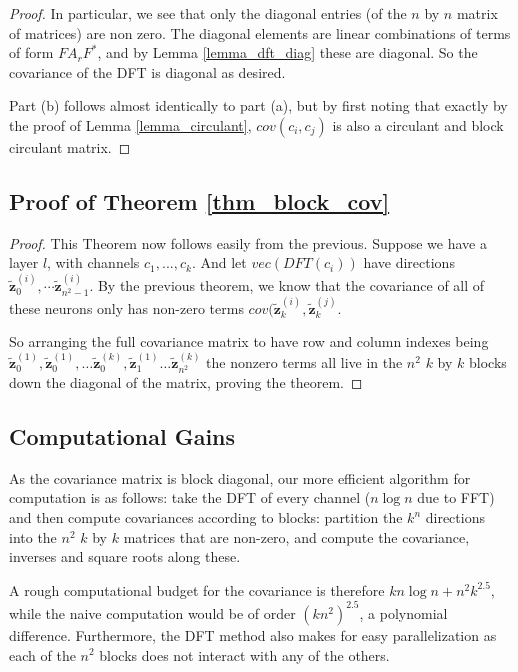 \documentclass{article} %
\begin{document}
\begin{proof}
In particular, we see that only the diagonal entries (of the $n$ by $n$ matrix of matrices) are non zero. The diagonal elements are linear combinations of terms of form $FA_r F^*$, and by Lemma \ref{lemma_dft_diag} these are diagonal. So the covariance of the DFT is diagonal as desired.

Part (b) follows almost identically to part (a), but by first noting that exactly by the proof of Lemma \ref{lemma_circulant}, $cov(c_i, c_j)$ is also a circulant and block circulant matrix.

\end{proof}

\subsection{Proof of Theorem \ref{thm_block_cov}}


\begin{proof}
This Theorem now follows easily from the previous. Suppose we have a layer $l$, with channels $c_1,...,c_k$. And let $vec(DFT(c_i))$ have directions $\tilde{\pmb{z}}^{(i)}_{0}, \cdots \tilde{\pmb{z}}^{(i)}_{n^2 - 1}$. By the previous theorem, we know that the covariance of all of these neurons only has non-zero terms $cov(\tilde{\pmb{z}}^{(i)}_{k}, \tilde{\pmb{z}}^{(j)}_{k}$.

So arranging the full covariance matrix to have row and column indexes being $\tilde{\pmb{z}}^{(1)}_{0}, \tilde{\pmb{z}}^{(1)}_{0}, \dots \tilde{\pmb{z}}^{(k)}_{0}, \tilde{\pmb{z}}^{(1)}_{1} \dots \tilde{\pmb{z}}^{(k)}_{n^2} $ the nonzero terms all live in the $n^2$ $k$ by $k$ blocks down the diagonal of the matrix, proving the theorem.
\end{proof}

\subsection{Computational Gains}
As the covariance matrix is block diagonal, our more efficient algorithm for computation is as follows: take the DFT of every channel ($n\log n$ due to FFT) and then compute covariances according to blocks: partition the $k^n$ directions into the $n^2$ $k$ by $k$ matrices that are non-zero, and compute the covariance, inverses and square roots along these.

A rough computational budget for the covariance is therefore $kn \log n + n^2k^{2.5}$, while the naive computation would be of order $(kn^2)^{2.5}$, a polynomial difference. Furthermore, the DFT method also makes for easy parallelization as each of the $n^2$ blocks does not interact with any of the others.
\end{document}
